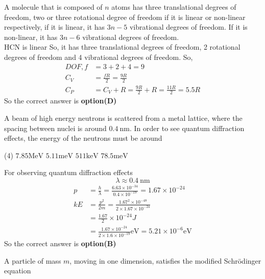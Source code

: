 \begin{questions}
\begin{tasks}
\end{tasks}
\begin{answer}
	A molecule that is composed of $n$ atoms has three translational degrees of freedom, two or three rotational degree of freedom if it is linear or non-linear respectively, if it is linear, it has $3 n-5$ vibrational degrees of freedom. If it is non-linear, it has $3 n-6$ vibrational degrees of freedom.\\
	$\mathrm{HCN}$ is linear
	So, it has three translational degrees of freedom, 2 rotational degrees of freedom and 4 vibrational degrees of freedom.
	So,
	$$
	\begin{aligned}
	D O F, f &=3+2+4=9 \\
	C_{V} &=\frac{f R}{2}=\frac{9 R}{2} \\
	C_{P} &=C_{V}+R=\frac{9 R}{2}+R=\frac{11 R}{2}=5.5 R
	\end{aligned}
	$$
	So the correct answer is \textbf{option(D)}
\end{answer}
\begin{minipage}{\textwidth}
	\question A beam of high energy neutrons is scattered from a metal lattice, where the spacing between nuclei is around $0.4 \mathrm{~nm}$. In order to see quantum diffraction effects, the energy of the neutrons must be around
\end{minipage}
\begin{tasks}(4)
	\task[\textbf{A.}] $7.85 \mathrm{MeV}$
	\task[\textbf{B.}] $5.11 \mathrm{meV}$
	\task[\textbf{C.}]   $511 \mathrm{keV}$
	\task[\textbf{D.}] $78.5 \mathrm{meV}$
\end{tasks}
\begin{answer}
	For observing quantum diffraction effects
	$$
	\lambda \approx 0.4 \mathrm{~nm}
	$$
	$$
	\begin{aligned}
	p &=\frac{h}{\lambda}=\frac{6.63 \times 10^{-34}}{0.4 \times 10^{-19}}=1.67 \times 10^{-24} \\
	k E &=\frac{p^{2}}{2 m}=\frac{1.67^{2} \times 10^{-48}}{2 \times 1.67 \times 10^{-24}} \\
	&=\frac{1.67}{2} \times 10^{-24} J \\
	&=\frac{1.67 \times 10^{-24}}{2 \times 1.6 \times 10^{-19}} \mathrm{eV}=5.21 \times 10^{-6} \mathrm{eV}
	\end{aligned}
	$$
	So the correct answer is \textbf{option(B)}
\end{answer}
\begin{minipage}{\textwidth}
	\question A particle of mass $m$, moving in one dimension, satisfies the modified Schrödinger equation

\end{minipage}
\end{questions}
